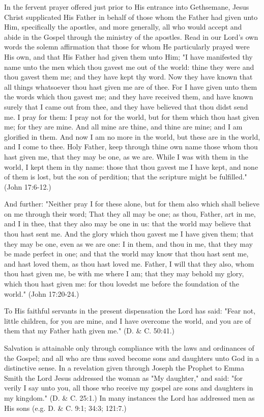 In the fervent prayer offered just prior to His entrance into Gethsemane, Jesus Christ
supplicated His Father in behalf of those whom the Father had given unto Him, specifically
the apostles, and more generally, all who would accept and abide in the Gospel through the
ministry of the apostles. Read in our Lord's own words the solemn affirmation that those for
whom He particularly prayed were His own, and that His Father had given them unto Him; "I
have manifested thy name unto the men which thou gavest me out of the world: thine they
were and thou gavest them me; and they have kept thy word. Now they have known that all
things whatsoever thou hast given me are of thee. For I have given unto them the words
which thou gavest me; and they have received them, and have known surely that I came out
from thee, and they have believed that thou didst send me. I pray for them: I pray not for the
world, but for them which thou hast given me; for they are mine. And all mine are thine, and
thine are mine; and I am glorified in them. And now I am no more in the world, but these are
in the world, and I come to thee. Holy Father, keep through thine own name those whom
thou hast given me, that they may be one, as we are. While I was with them in the world, I
kept them in thy name: those that thou gavest me I have kept, and none of them is lost, but
the son of perdition; that the scripture might be fulfilled." (John 17:6-12.)

And further: "Neither pray I for these alone, but for them also which shall believe on me
through their word; That they all may be one; as thou, Father, art in me, and I in thee, that
they also may be one in us: that the world may believe that thou hast sent me. And the glory
which thou gavest me I have given them; that they may be one, even as we are one: I in them,
and thou in me, that they may be made perfect in one; and that the world may know that thou
hast sent me, and hast loved them, as thou hast loved me. Father, I will that they also, whom
thou hast given me, be with me where I am; that they may behold my glory, which thou hast
given me: for thou lovedst me before the foundation of the world." (John 17:20-24.)

To His faithful servants in the present dispensation the Lord has said: "Fear not, little
children, for you are mine, and I have overcome the world, and you are of them that my
Father hath given me." (D. \& C. 50:41.)

Salvation is attainable only through compliance with the laws and ordinances of the Gospel;
and all who are thus saved become sons and daughters unto God in a distinctive sense. In a
revelation given through Joseph the Prophet to Emma Smith the Lord Jesus addressed the
woman as "My daughter," and said: "for verily I say unto you, all those who receive my
gospel are sons and daughters in my kingdom." (D. \& C. 25:1.) In many instances the Lord
has addressed men as His sons (e.g. D. \& C. 9:1; 34:3; 121:7.)

